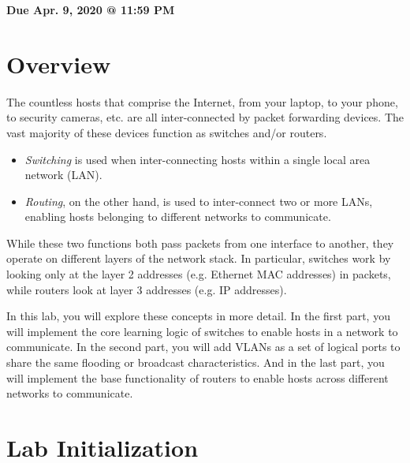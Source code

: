 \documentclass[11pt]{article}
\makeatletter
\def\datedue{Apr. 9, 2020 @ 11:59 PM}
\makeatother
\begin{document}
\maketitle \thispagestyle{fancy}

\hfill {\large \textbf{Due \datedue}}


\section{Overview}
\label{sec:overview}
The countless hosts that comprise the Internet, from your laptop, to your phone, to security cameras, etc. are all inter-connected by packet forwarding devices.
The vast majority of these devices function as switches and/or routers.
\begin{itemize}
    \item \textit{Switching} is used when inter-connecting hosts within a single local area network (LAN).
    \item \textit{Routing}, on the other hand, is used to inter-connect two or more LANs, enabling hosts belonging to different networks to communicate.
\end{itemize}
While these two functions both pass packets from one interface to another, they operate on different layers of the network stack.
In particular, switches work by looking only at the layer 2 addresses (e.g. Ethernet MAC addresses) in packets, while routers look at layer 3 addresses (e.g. IP addresses).

In this lab, you will explore these concepts in more detail.
In the first part, you will implement the core learning logic of switches to enable hosts in a network to communicate.
In the second part, you will add VLANs as a set of logical ports to share the same flooding or broadcast characteristics.
And in the last part, you will implement the base functionality of routers to enable hosts across different networks to communicate.

\section{Lab Initialization}
\label{sec:lab-init}
\end{document}
